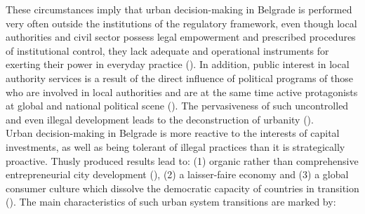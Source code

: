 \documentclass[11pt]{report}
\begin{document}
These circumstances imply that urban decision-making in Belgrade is performed very often outside the  institutions of the regulatory framework, even though local authorities and civil sector possess legal empowerment and prescribed procedures of institutional control, they lack adequate and  operational  instruments  for  exerting  their  power in everyday practice  (\href{Bajec}{\citealt{bajec_rational_2009}}).
In addition, public interest in local authority services is a result of the direct influence of political programs of those who are involved in local authorities and are at the same time active protagonists at global and national political scene  (\href{Djokic}{\citealt{djokic_political_2007}}). The pervasiveness of such uncontrolled and even illegal development leads to the deconstruction of urbanity (\href{Vujovic}{\citealt{vujovic_belgrades_2007}}).
\\

Urban decision-making in Belgrade is more reactive to the interests of capital investments, as well as being tolerant of illegal practices than it is strategically proactive.
Thusly produced results lead to:
(1) organic rather than comprehensive entrepreneurial city development (\href{Petrovic}{\citealt{petrovic_cities_2009}}),
(2) a laisser-faire economy and
(3) a global consumer culture which dissolve the democratic 
capacity of countries in transition (\href{Ellin}{\citealt{ellin_postmodern_1999}}).
The main characteristics of such urban system transitions  are marked by: 
\end{document}
